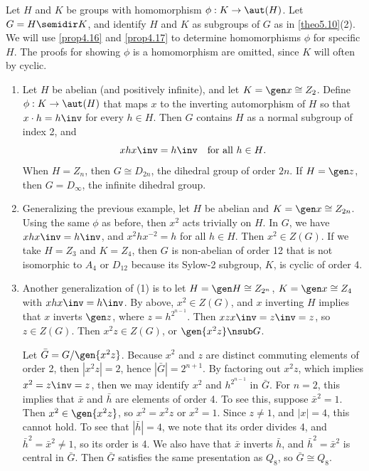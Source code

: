 \begin{ex}
    Let $H$ and $K$ be groups with homomorphism $\phi : K \to \aut(H)$. Let $G = H \semidir K$, and identify $H$ and $K$ as subgroups of $G$ as in \autoref{theo5.10}(2). We will use \autoref{prop4.16} and \autoref{prop4.17} to determine homomorphisms $\phi$ for specific $H$. The proofs for showing $\phi$ is a homomorphism are omitted, since $K$ will often by cyclic.
    \begin{enumerate}
        \item Let $H$ be abelian (and positively infinite), and let $K = \gen x \cong Z_2$. Define $\phi : K \to \aut(H)$ that maps $x$ to the inverting automorphism of $H$ so that $x \cdot h = h\inv$ for every $h \in H$. Then $G$ contains $H$ as a normal subgroup of index 2, and
        \[xhx\inv = h\inv \quad \text{for all $h \in H$.}\]
        When $H = Z_n$, then $G \cong D_{2n}$, the dihedral group of order $2n$. If $H = \gen z$, then $G = D_\infty$, the infinite dihedral group.
        \item Generalizing the previous example, let $H$ be abelian and $K = \gen x \cong Z_{2n}$. Using the same $\phi$ as before, then $x^2$ acts trivially on $H$. In $G$, we have $xhx\inv = h\inv$, and $x^2hx^{-2} = h$ for all $h \in H$. Then $x^2 \in Z(G)$. If we take $H = Z_3$ and $K = Z_4$, then $G$ is non-abelian of order 12 that is not isomorphic to $A_4$ or $D_{12}$ because its Sylow-2 subgroup, $K$, is cyclic of order 4.
        \item Another generalization of (1) is to let $H = \gen H \cong Z_{2^n}$, $K = \gen x \cong Z_4$ with $xhx\inv = h\inv$. By above, $x^2 \in Z(G)$, and $x$ inverting $H$ implies that $x$ inverts $\gen z$, where $z = h^{2^{n - 1}}$. Then $xzx\inv = z\inv = z$, so $z \in Z(G)$. Then $x^2z \in Z(G)$, or $\gen{x^2z} \nsub G$.
        
        Let $\bar G = G/\gen{x^2z}$. Because $x^2$ and $z$ are distinct commuting elements of order 2, then $|x^2z| = 2$, hence $|\bar G| = 2^{n + 1}$. By factoring out $x^2z$, which implies $x^2 = z\inv = z$, then we may identify $x^2$ and $h^{2^{n - 1}}$ in $\bar G$. For $n = 2$, this implies that $\bar x$ and $\bar h$ are elements of order 4. To see this, suppose $\bar x^2 = 1$. Then $x^2 \in \gen{x^2z}$, so $x^2 = x^2z$ or $x^2 = 1$. Since $z \neq 1$, and $|x| = 4$, this cannot hold. To see that $|\bar h|= 4$, we note that its order divides 4, and $\bar h^2 = \bar x^2 \neq 1$, so its order is 4. We also have that $\bar x$ inverts $\bar h$, and $\bar h^2 = \bar x^2$ is central in $\bar G$. Then $\bar G$ satisfies the same presentation as $Q_8$, so $\bar G \cong Q_8$.


\end{enumerate}
\end{ex}
